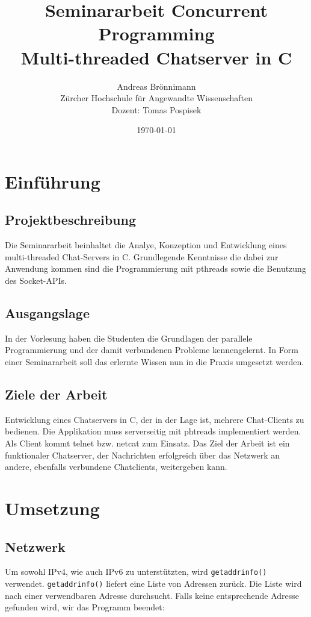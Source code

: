 \documentclass[a4paper]{article}
\title {Seminararbeit Concurrent Programming\\
Multi-threaded Chatserver in C\\}
\author {Andreas Brönnimann\\
Zürcher Hochschule für Angewandte Wissenschaften\\
Dozent: Tomas Pospisek}
\date {\today}
\begin{document}
\maketitle
\setcounter{page}{0}
\thispagestyle{empty}

\newpage

\setcounter{tocdepth}{3}
\tableofcontents

\newpage

\section{Einführung}
\subsection{Projektbeschreibung}
Die Seminararbeit beinhaltet die Analye, Konzeption und Entwicklung eines multi-threaded Chat-Servers in C. Grundlegende Kenntnisse die dabei zur Anwendung kommen sind die Programmierung mit pthreads sowie die Benutzung des Socket-APIs.

\subsection{Ausgangslage}
In der Vorlesung haben die Studenten die Grundlagen der parallele Programmierung und der damit verbundenen Probleme kennengelernt. In Form einer Seminararbeit soll das erlernte Wissen nun in die Praxis umgesetzt werden.

\subsection{Ziele der Arbeit}
Entwicklung eines Chatservers in C, der in der Lage ist, mehrere Chat-Clients zu bedienen. Die Applikation muss serverseitig mit phtreads implementiert werden. Als Client kommt telnet bzw. netcat zum Einsatz. Das Ziel der Arbeit ist ein funktionaler Chatserver, der Nachrichten erfolgreich über das Netzwerk an andere, ebenfalls verbundene Chatclients, weitergeben kann.

\section{Umsetzung}
\subsection{Netzwerk}
Um sowohl IPv4, wie auch IPv6 zu unterstützten, wird \texttt{getaddrinfo()} verwendet. \texttt{getaddrinfo()} liefert eine Liste von Adressen zurück. Die Liste wird nach einer verwendbaren Adresse durchsucht. Falls keine entsprechende Adresse gefunden wird, wir das Programm beendet:
\end{document}
